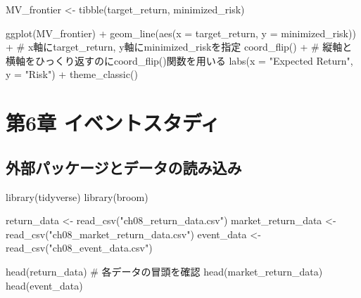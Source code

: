 \documentclass[
  letterpaper,
  DIV=11,
  numbers=noendperiod]{scrreprt}
\newenvironment{Shaded}{\begin{snugshade}}{\end{snugshade}}
\newcommand{\AttributeTok}[1]{\textcolor[rgb]{0.40,0.45,0.13}{#1}}
\newcommand{\CommentTok}[1]{\textcolor[rgb]{0.37,0.37,0.37}{#1}}
\newcommand{\FunctionTok}[1]{\textcolor[rgb]{0.28,0.35,0.67}{#1}}
\newcommand{\NormalTok}[1]{\textcolor[rgb]{0.00,0.23,0.31}{#1}}
\newcommand{\OtherTok}[1]{\textcolor[rgb]{0.00,0.23,0.31}{#1}}
\newcommand{\SpecialCharTok}[1]{\textcolor[rgb]{0.37,0.37,0.37}{#1}}
\newcommand{\StringTok}[1]{\textcolor[rgb]{0.13,0.47,0.30}{#1}}
\begin{document}
\begin{Shaded}
\begin{Highlighting}[]
\NormalTok{MV\_frontier }\OtherTok{\textless{}{-}} \FunctionTok{tibble}\NormalTok{(target\_return, minimized\_risk)}

\FunctionTok{ggplot}\NormalTok{(MV\_frontier) }\SpecialCharTok{+} 
  \FunctionTok{geom\_line}\NormalTok{(}\FunctionTok{aes}\NormalTok{(}\AttributeTok{x =}\NormalTok{ target\_return, }\AttributeTok{y =}\NormalTok{ minimized\_risk)) }\SpecialCharTok{+} \CommentTok{\# x軸にtarget\_return, y軸にminimized\_riskを指定}
  \FunctionTok{coord\_flip}\NormalTok{() }\SpecialCharTok{+} \CommentTok{\# 縦軸と横軸をひっくり返すのにcoord\_flip()関数を用いる}
  \FunctionTok{labs}\NormalTok{(}\AttributeTok{x =} \StringTok{"Expected Return"}\NormalTok{, }\AttributeTok{y =} \StringTok{"Risk"}\NormalTok{) }\SpecialCharTok{+} 
  \FunctionTok{theme\_classic}\NormalTok{()}
\end{Highlighting}
\end{Shaded}

\chapter{第6章
イベントスタディ}\label{ux7b2c6ux7ae0-ux30a4ux30d9ux30f3ux30c8ux30b9ux30bfux30c7ux30a3}

\section{外部パッケージとデータの読み込み}\label{ux5916ux90e8ux30d1ux30c3ux30b1ux30fcux30b8ux3068ux30c7ux30fcux30bfux306eux8aadux307fux8fbcux307f}

\begin{Shaded}
\begin{Highlighting}[]
\FunctionTok{library}\NormalTok{(tidyverse)}
\FunctionTok{library}\NormalTok{(broom)}

\NormalTok{return\_data }\OtherTok{\textless{}{-}} \FunctionTok{read\_csv}\NormalTok{(}\StringTok{"ch08\_return\_data.csv"}\NormalTok{)}
\NormalTok{market\_return\_data }\OtherTok{\textless{}{-}} \FunctionTok{read\_csv}\NormalTok{(}\StringTok{"ch08\_market\_return\_data.csv"}\NormalTok{)}
\NormalTok{event\_data }\OtherTok{\textless{}{-}} \FunctionTok{read\_csv}\NormalTok{(}\StringTok{"ch08\_event\_data.csv"}\NormalTok{)}

\FunctionTok{head}\NormalTok{(return\_data) }\CommentTok{\# 各データの冒頭を確認}
\FunctionTok{head}\NormalTok{(market\_return\_data)}
\FunctionTok{head}\NormalTok{(event\_data)}
\end{Highlighting}
\end{Shaded}
\end{document}
